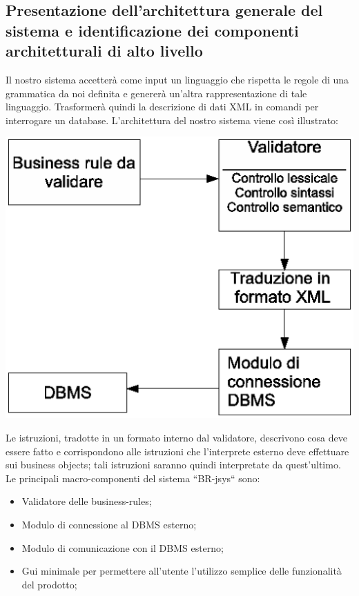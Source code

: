 \documentclass[11pt,titlepage,a4paper]{report}
\begin{document}
\subsection{Presentazione dell'architettura generale del sistema e identificazione dei componenti architetturali di alto livello}
Il nostro sistema accetter\`a come input un linguaggio che rispetta le regole di una grammatica da noi definita e generer\`a un'altra rappresentazione di tale linguaggio. Trasformer\`a quindi la descrizione di dati XML in comandi per interrogare un database. L'architettura del nostro sistema viene cos\`i illustrato:
\begin{center}
\includegraphics[width=1\textwidth]{st.eps}
\end{center}
Le istruzioni, tradotte in un formato interno dal validatore, descrivono cosa deve essere fatto e corrispondono alle istruzioni che l'interprete esterno deve effettuare sui business objects; tali istruzioni saranno quindi interpretate da quest'ultimo.
Le principali macro-componenti del sistema ``BR-jsys`` sono:
\begin{itemize}
\item Validatore delle business-rules;
\item Modulo di connessione al DBMS esterno;
\item Modulo di comunicazione con il DBMS esterno;
\item Gui minimale per permettere all'utente l'utilizzo semplice delle funzionalit\`a del prodotto;
\end{itemize}
\end{document}
